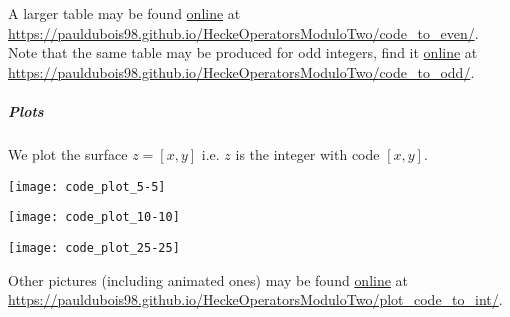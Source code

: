 A larger table may be found \href{https://pauldubois98.github.io/HeckeOperatorsModuloTwo/code_to_even/}{online} at \url{https://pauldubois98.github.io/HeckeOperatorsModuloTwo/code_to_even/}.
Note that the same table may be produced for odd integers, find it  \href{https://pauldubois98.github.io/HeckeOperatorsModuloTwo/code_to_odd/}{online} at \url{https://pauldubois98.github.io/HeckeOperatorsModuloTwo/code_to_odd/}.



\subparagraph{Plots}
\label{plot:CodeSurface}
We plot the surface $z = \left[ x, y \right]$ i.e. $z$ is the integer with code $\left[ x, y \right]$.
\begin{center}
	\texttt{[image: code\_plot\_5-5]}
\end{center}
\begin{center}
	\texttt{[image: code\_plot\_10-10]}
\end{center}
\begin{center}
	\texttt{[image: code\_plot\_25-25]}
\end{center}
Other pictures (including animated ones) may be found \href{https://pauldubois98.github.io/HeckeOperatorsModuloTwo/plot_code_to_int/}{online} at \url{https://pauldubois98.github.io/HeckeOperatorsModuloTwo/plot_code_to_int/}.



